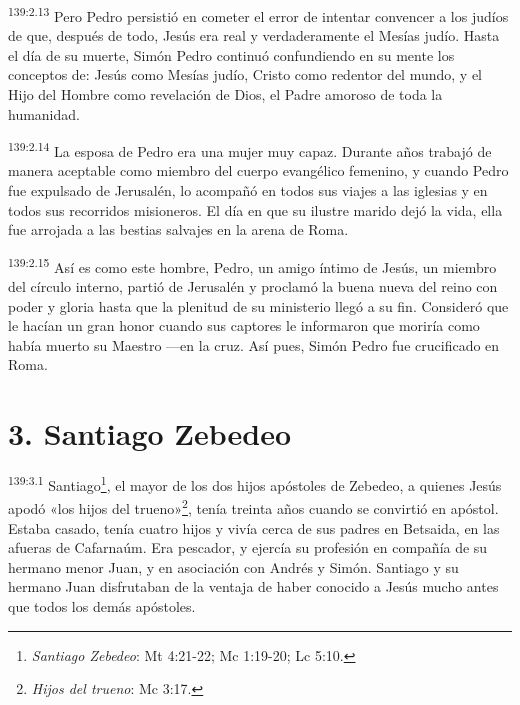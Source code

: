\par
\textsuperscript{139:2.13} Pero Pedro persistió en cometer el error de intentar convencer a los judíos de que, después de todo, Jesús era real y verdaderamente el Mesías judío. Hasta el día de su muerte, Simón Pedro continuó confundiendo en su mente los conceptos de: Jesús como Mesías judío, Cristo como redentor del mundo, y el Hijo del Hombre como revelación de Dios, el Padre amoroso de toda la humanidad.

\par
\textsuperscript{139:2.14} La esposa de Pedro era una mujer muy capaz. Durante años trabajó de manera aceptable como miembro del cuerpo evangélico femenino, y cuando Pedro fue expulsado de Jerusalén, lo acompañó en todos sus viajes a las iglesias y en todos sus recorridos misioneros. El día en que su ilustre marido dejó la vida, ella fue arrojada a las bestias salvajes en la arena de Roma.

\par
\textsuperscript{139:2.15} Así es como este hombre, Pedro, un amigo íntimo de Jesús, un miembro del círculo interno, partió de Jerusalén y proclamó la buena nueva del reino con poder y gloria hasta que la plenitud de su ministerio llegó a su fin. Consideró que le hacían un gran honor cuando sus captores le informaron que moriría como había muerto su Maestro ---en la cruz. Así pues, Simón Pedro fue crucificado en Roma.

\section*{3. Santiago Zebedeo}
\par
\textsuperscript{139:3.1} Santiago\footnote{\textit{Santiago Zebedeo}: Mt 4:21-22; Mc 1:19-20; Lc 5:10.}, el mayor de los dos hijos apóstoles de Zebedeo, a quienes Jesús apodó «los hijos del trueno»\footnote{\textit{Hijos del trueno}: Mc 3:17.}, tenía treinta años cuando se convirtió en apóstol. Estaba casado, tenía cuatro hijos y vivía cerca de sus padres en Betsaida, en las afueras de Cafarnaúm. Era pescador, y ejercía su profesión en compañía de su hermano menor Juan, y en asociación con Andrés y Simón. Santiago y su hermano Juan disfrutaban de la ventaja de haber conocido a Jesús mucho antes que todos los demás apóstoles.

